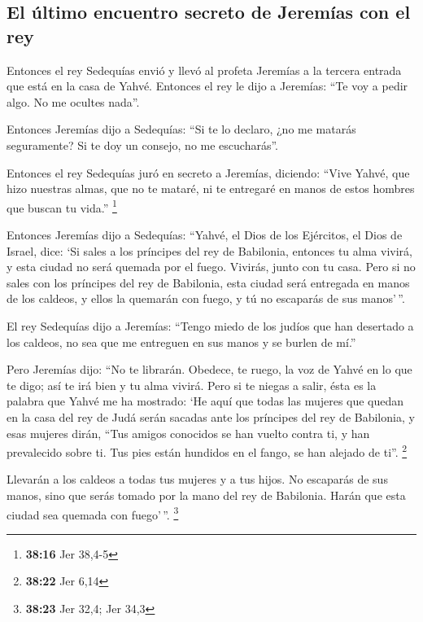 \begin{paracol}{2}
{\subsection{El último encuentro secreto de Jeremías con el
rey}\label{el-uxfaltimo-encuentro-secreto-de-jeremuxedas-con-el-rey}}

 Entonces el rey Sedequías envió y llevó al profeta
Jeremías a la tercera entrada que está en la casa de Yahvé. Entonces el
rey le dijo a Jeremías: ``Te voy a pedir algo. No me ocultes nada''.

 Entonces Jeremías dijo a Sedequías: ``Si te lo declaro,
¿no me matarás seguramente? Si te doy un consejo, no me escucharás''.

 Entonces el rey Sedequías juró en secreto a Jeremías,
diciendo: ``Vive Yahvé, que hizo nuestras almas, que no te mataré, ni te
entregaré en manos de estos hombres que buscan tu vida.'' \footnote{\textbf{38:16}
  Jer 38,4-5}

 Entonces Jeremías dijo a Sedequías: ``Yahvé, el Dios de
los Ejércitos, el Dios de Israel, dice: `Si sales a los príncipes del
rey de Babilonia, entonces tu alma vivirá, y esta ciudad no será quemada
por el fuego. Vivirás, junto con tu casa.  Pero si no
sales con los príncipes del rey de Babilonia, esta ciudad será entregada
en manos de los caldeos, y ellos la quemarán con fuego, y tú no
escaparás de sus manos'\,''.

 El rey Sedequías dijo a Jeremías: ``Tengo miedo de los
judíos que han desertado a los caldeos, no sea que me entreguen en sus
manos y se burlen de mí.''

 Pero Jeremías dijo: ``No te librarán. Obedece, te ruego,
la voz de Yahvé en lo que te digo; así te irá bien y tu alma vivirá.
 Pero si te niegas a salir, ésta es la palabra que Yahvé
me ha mostrado:  `He aquí que todas las mujeres que
quedan en la casa del rey de Judá serán sacadas ante los príncipes del
rey de Babilonia, y esas mujeres dirán, ``Tus amigos conocidos se han
vuelto contra ti, y han prevalecido sobre ti. Tus pies están hundidos en
el fango, se han alejado de ti''. \footnote{\textbf{38:22} Jer 6,14}

 Llevarán a los caldeos a todas tus mujeres y a tus
hijos. No escaparás de sus manos, sino que serás tomado por la mano del
rey de Babilonia. Harán que esta ciudad sea quemada con fuego'\,''.
\footnote{\textbf{38:23} Jer 32,4; Jer 34,3}


\end{paracol}
